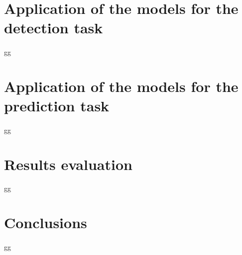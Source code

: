 
\section{Application of the models for the detection task} \label{sec: step_models_detection_task}
\paragraph{} gg


\section{Application of the models for the prediction task} \label{sec: step_models_prediction_task}
\paragraph{} gg


\section{Results evaluation} \label{sec: step_restults_evaluation}
\paragraph{} gg


\section{Conclusions} \label{sec: step_conclusions}
\paragraph{} gg
